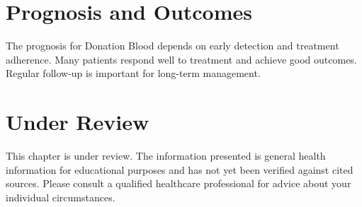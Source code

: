\section*{Prognosis and Outcomes}
The prognosis for Donation Blood depends on early detection and treatment adherence. Many patients respond well to treatment and achieve good outcomes. Regular follow-up is important for long-term management.
\section*{Under Review}
This chapter is under review. The information presented is general health information for educational purposes and has not yet been verified against cited sources. Please consult a qualified healthcare professional for advice about your individual circumstances.


\clearpage
